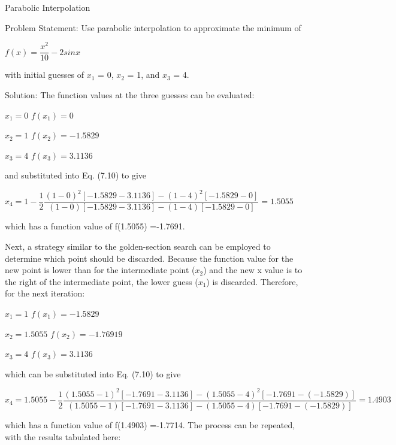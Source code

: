 \documentclass[../main.tex]{subfiles}
\begin{document}
\begin{example}
	Parabolic Interpolation
	\smallskip
	
	\noindent Problem Statement:
	Use parabolic interpolation to approximate the minimum of

	$ f(x) = \dfrac{x^2}{10}-2sinx $
	\medskip
	
	with initial guesses of $x_1$ = 0, $x_2$ = 1, and $x_3$ = 4.

	\noindent Solution: The function values at the three guesses can be evaluated:
	\medskip

	$x_1 = 0$ \hspace{2cm} $f(x_1)=0$

	$x_2 = 1$ \hspace{2cm} $f(x_2)=-1.5829$

	$x_3 = 4$ \hspace{2cm} $f(x_3)=3.1136$
	\medskip

	\noindent and substituted into Eq. (7.10) to give
	\medskip
    
	$x_4=1- \dfrac{1}{2}\dfrac{(1-0)^2[-1.5829-3.1136]-(1-4)^2[-1.5829-0]}{(1-0)[-1.5829-3.1136]-(1-4)[-1.5829-0]}=1.5055 $
	\medskip

	\noindent which has a function value of f(1.5055) =-1.7691.

	Next, a strategy similar to the golden-section search can be employed to determine
	which point should be discarded. Because the function value for the new point is lower
	than for the intermediate point ($x_2$) and the new x value is to the right of the intermediate
	point, the lower guess ($x_1$) is discarded. Therefore, for the next iteration:
	\medskip

	$x_1 = 1$      \hspace{2cm} $f(x_1)=-1.5829$

	$x_2 = 1.5055$ \hspace{2cm} $f(x_2)=-1.76919$

	$x_3 = 4$      \hspace{2cm} $f(x_3)=3.1136$
	\medskip

	\noindent which can be substituted into Eq. (7.10) to give
	\medskip

	$x_4=1.5055-\dfrac{1}{2}\dfrac{(1.5055-1)^2[-1.7691-3.1136]-(1.5055-4)^2[-1.7691-(-1.5829)]}{(1.5055-1)[-1.7691-3.1136]-(1.5055-4)[-1.7691-(-1.5829)]}=1.4903 $
	\medskip

	\noindent which has a function value of f(1.4903) =-1.7714. The process can be repeated, with the
	results tabulated here:


\end{example}
\end{document}
